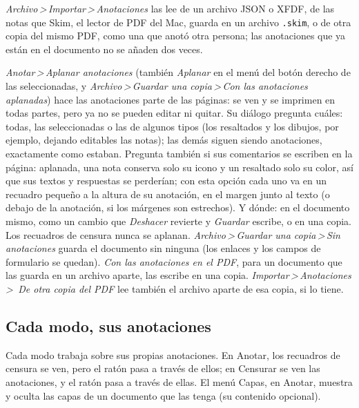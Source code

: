 \documentclass[12pt,
              article,
              oneside
              ]{memoir}
\newcommand*{\menu}[1]{\textit{#1}}
\newcommand*{\then}{\,>\,}
\begin{document}
\noindent{}%
\menu{Archivo\then Importar\then Anotaciones} las lee de un
archivo JSON o XFDF, de las notas que Skim, el lector de PDF del Mac,
guarda en un archivo \texttt{.skim}, o de otra copia del mismo PDF, como
una que anotó otra persona; las anotaciones que ya están en el documento no se añaden dos
veces.

%
%
\menu{Anotar\then Aplanar anotaciones} (también \menu{Aplanar} en el menú
del botón derecho de las seleccionadas, y \menu{Archivo\then Guardar una
copia\then Con las anotaciones aplanadas}) hace las anotaciones parte de
las páginas: se ven y se imprimen en todas partes, pero ya no se pueden
editar ni quitar. Su diálogo pregunta cuáles: todas, las seleccionadas o
las de algunos tipos (los resaltados y los dibujos, por ejemplo, dejando
editables las notas); las demás siguen siendo anotaciones, exactamente
como estaban. Pregunta también si sus comentarios se escriben en la
página: aplanada, una nota conserva solo su icono y un resaltado solo su
color, así que sus textos y respuestas se perderían; con esta opción cada
uno va en un recuadro pequeño a la altura de su anotación, en el margen
junto al texto (o debajo de la anotación, si los márgenes son estrechos). Y
dónde: en el documento mismo, como un cambio que \menu{Deshacer} revierte y
\menu{Guardar} escribe, o en una copia. Los recuadros de censura nunca se
aplanan. \menu{Archivo\then Guardar una copia\then Sin anotaciones} guarda el documento sin
ninguna (los enlaces y los campos de formulario se quedan). \menu{Con las
anotaciones en el PDF}, para un documento que las guarda en un archivo
aparte, las escribe en una copia. \menu{Importar\then Anotaciones\then
De otra copia del PDF} lee también el archivo aparte de esa copia, si lo
tiene.

\subsection{Cada modo, sus anotaciones}

%
Cada modo trabaja sobre sus propias anotaciones. En Anotar, los recuadros
de censura se ven, pero el ratón pasa a través de ellos; en Censurar se
ven las anotaciones, y el ratón pasa a través de ellas. El menú Capas, en
Anotar, muestra y oculta las capas de un documento que las tenga (su
contenido opcional).
\end{document}
